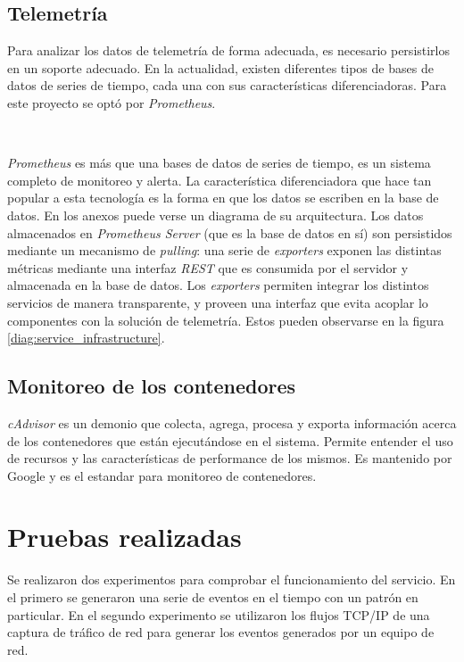 \documentclass[a4paper,12pt, oneside]{article}
\begin{document}
\subsection{Telemetría}
Para analizar los datos de telemetría de forma adecuada, es necesario persistirlos en un soporte adecuado. En la actualidad, existen diferentes tipos de bases de datos de series de tiempo, cada una con sus características diferenciadoras. Para este proyecto se optó por \textit{Prometheus}.

\

\textit{Prometheus} es más que una bases de datos de series de tiempo, es un sistema completo de monitoreo y alerta. La característica diferenciadora que hace tan popular a esta tecnología es la forma en que los datos se escriben en la base de datos. En los anexos puede verse un diagrama de su arquitectura. Los datos almacenados en \textit{Prometheus Server} (que es la base de datos en sí) son persistidos mediante un mecanismo de \textit{pulling}: una serie de \textit{exporters} exponen las distintas métricas mediante una interfaz \textit{REST} que es consumida por el servidor y almacenada en la base de datos. Los \textit{exporters} permiten integrar los distintos servicios de manera transparente, y proveen una interfaz que evita acoplar lo componentes con la solución de telemetría. Estos pueden observarse en la figura \ref{diag:service_infrastructure}.

\subsection{Monitoreo de los contenedores}
\textit{cAdvisor} es un demonio que colecta, agrega, procesa y exporta información acerca de los contenedores que están ejecutándose en el sistema. Permite entender el uso de recursos y las características de performance de los mismos. Es mantenido por Google y es el estandar para monitoreo de contenedores.

\newpage

\section{Pruebas realizadas}
Se realizaron dos experimentos para comprobar el funcionamiento del servicio. En el primero se generaron una serie de eventos en el tiempo con un patrón en particular. En el segundo experimento se utilizaron los flujos TCP/IP de una captura de tráfico de red para generar los eventos generados por un equipo de red. 
\end{document}
